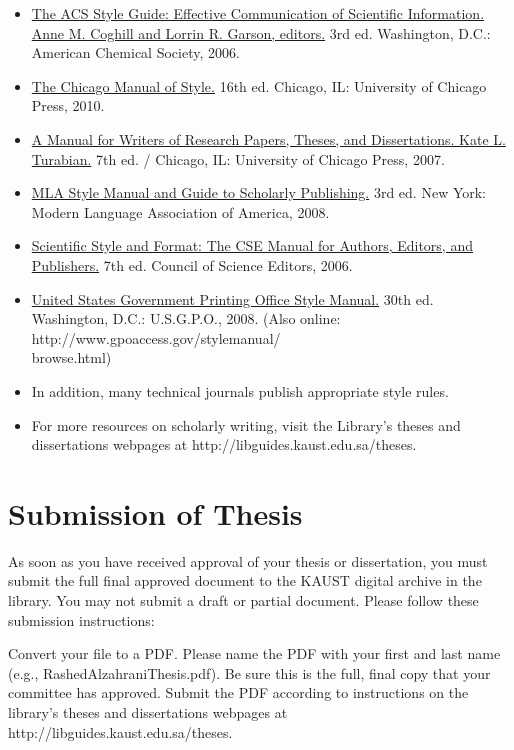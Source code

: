 \begin{itemize}
\item\underline{The ACS Style Guide: Effective Communication of Scientific Information.}\\ \underline{Anne M. Coghill and Lorrin R. Garson, editors.} 3rd ed.  Washington, D.C.: American Chemical Society, 2006.
\item\underline{The Chicago Manual of Style.} 16th ed. Chicago, IL: University of Chicago Press, 2010.
\item\underline{A Manual for Writers of Research Papers, Theses, and Dissertations. Kate L.}\\ \underline{Turabian.} 7th ed. / Chicago, IL: University of Chicago Press, 2007.
\item\underline{MLA Style Manual and Guide to Scholarly Publishing.} 3rd ed. New York: Modern Language Association of America, 2008.
\item\underline{Scientific Style and Format: The CSE Manual for Authors, Editors, and}\\ \underline{Publishers.} 7th ed.  Council of Science Editors, 2006.
\item\underline{United States Government Printing Office Style Manual.} 30th ed. Washington, D.C.: U.S.G.P.O., 2008. (Also online: http://www.gpoaccess.gov/stylemanual/\\browse.html)
\item In addition, many technical journals publish appropriate style rules.
\item For more resources on scholarly writing, visit the Library's theses and dissertations webpages at http://libguides.kaust.edu.sa/theses.

\end{itemize}

\section{Submission of Thesis}

As soon as you have received approval of your thesis or dissertation, you must submit the full final approved document to the KAUST digital archive in the library. You may not submit a draft or partial document. Please follow these submission instructions:

Convert your file to a PDF. Please name the PDF with your first and last name (e.g., RashedAlzahraniThesis.pdf). Be sure this is the full, final copy that your committee has approved. Submit the PDF according to instructions on the library's theses and dissertations webpages at http://libguides.kaust.edu.sa/theses.

